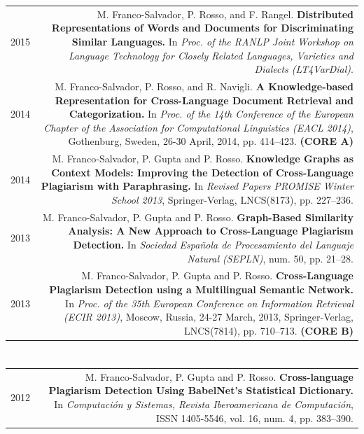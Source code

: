 \documentclass[10pt]{article}
\begin{document}
\begin{tabular}{L!{\VRule}R}
	2015&M. Franco-Salvador, P. Rosso, and F. Rangel. \textbf{Distributed Representations of Words and Documents for Discriminating Similar Languages.}
	In \emph{Proc. of the RANLP Joint Workshop on Language Technology for Closely Related Languages, Varieties and Dialects (LT4VarDial)}. \vspace{5pt}\\
	2014&M. Franco-Salvador, P. Rosso, and R. Navigli. \textbf{A Knowledge-based Representation for Cross-Language Document Retrieval and Categorization.}
	In \emph{Proc. of the 14th Conference of the European Chapter of the Association for Computational Linguistics (EACL 2014)}, Gothenburg, Sweden, 26-30 April, 2014, pp. 414--423. \textbf{(CORE A)} \vspace{5pt}\\
	2014&M. Franco-Salvador, P. Gupta and P. Rosso. \textbf{Knowledge Graphs as Context Models: Improving the Detection of Cross-Language Plagiarism with Paraphrasing.}
	In \emph{Revised Papers PROMISE Winter School 2013}, Springer-Verlag, LNCS(8173), pp. 227--236.\vspace{5pt}\\
	2013&M. Franco-Salvador, P. Gupta and P. Rosso. \textbf{Graph-Based Similarity Analysis: A New Approach to Cross-Language Plagiarism Detection.} 
	In \emph{Sociedad Espa{\~n}ola de Procesamiento del Languaje Natural (SEPLN)}, num. 50, pp. 21--28.\vspace{5pt}\\
	2013&M. Franco-Salvador, P. Gupta and P. Rosso. \textbf{Cross-Language Plagiarism Detection using a Multilingual Semantic Network.} 
	In \emph{Proc. of the 35th European Conference on Information Retrieval (ECIR 2013)}, Moscow, Russia, 24-27 March, 2013, Springer-Verlag, LNCS(7814), pp. 710--713. \textbf{(CORE B)}\vspace{5pt}\\
\end{tabular}

\section*{}
\begin{tabular}{L!{\VRule}R}
	2012&M. Franco-Salvador, P. Gupta and P. Rosso. \textbf{Cross-language Plagiarism Detection Using BabelNet's Statistical Dictionary.} 
	In \emph{Computaci{\'o}n y Sistemas, Revista Iberoamericana de Computaci{\'o}n}, ISSN 1405-5546, vol. 16, num. 4, pp. 383--390.\vspace{5pt}\\
\end{tabular}
\end{document}
